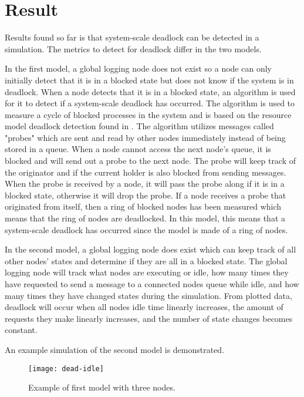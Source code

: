 \documentclass{article}
\begin{document}
\section{Result} %

Results found so far is that system-scale deadlock can be detected in a simulation. The metrics to detect for deadlock differ in the two models.

In the first model, a global logging node does not exist so a node can only initially detect that it is in a blocked state but does not know if the system is in deadlock. When a node detects that it is in a blocked state, an algorithm is used for it to detect if a system-scale deadlock has occurred. The algorithm is used to measure a cycle of blocked processes in the system and is based on the resource model deadlock detection found in \cite[p. 149]{1983_Chandy}. The algorithm utilizes messages called "probes" which are sent and read by other nodes immediately instead of being stored in a queue. When a node cannot access the next node's queue, it is blocked and will send out a probe to the next node. The probe will keep track of the originator and if the current holder is also blocked from sending messages. When the probe is received by a node, it will pass the probe along if it is in a blocked state, otherwise it will drop the probe. If a node receives a probe that originated from itself, then a ring of blocked nodes has been measured which means that the ring of nodes are deadlocked. In this model, this means that a system-scale deadlock has occurred since the model is made of a ring of nodes.

In the second model, a global logging node does exist which can keep track of all other nodes' states and determine if they are all in a blocked state. The global logging node will track what nodes are executing or idle, how many times they have requested to send a message to a connected nodes queue while idle, and how many times they have changed states during the simulation. From plotted data, deadlock will occur when all nodes idle time linearly increases, the amount of requests they make linearly increases, and the number of state changes becomes constant. 

An example simulation of the second model is demonstrated.

\begin{figure}[H]
	\texttt{[image: dead-idle]}\newline
	\centering
	\caption{Example of first model with three nodes.}
	\centering
\end{figure}
\end{document}
